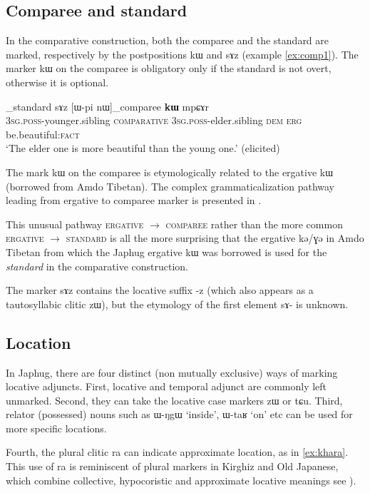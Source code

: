 \documentclass[oldfontcommands,oneside,a4paper,11pt]{article}
\newcommand{\ipa}[1]{{\phon #1}} %
\begin{document}
\subsection{Comparee and standard}
In the comparative construction, both the comparee and the standard are marked, respectively by the postpositions \ipa{kɯ} and \ipa{sɤz}  (example \ref{ex:comp1}). The marker \ipa{kɯ} on the comparee is obligatory only if the standard is not overt, otherwise it is optional.

\begin{exe}
\ex \label{ex:comp1}
\gll  [\ipa{ɯ-ʁi}]_{standard}   	\ipa{sɤz}   	[\ipa{ɯ-pi}   	\ipa{nɯ}]_{comparee}   	\ipa{\textbf{kɯ}}   	\ipa{mpɕɤr}     \\
\textsc{3sg.poss}-younger.sibling \textsc{comparative} \textsc{3sg.poss}-elder.sibling \textsc{dem} \textsc{erg}  be.beautiful:\textsc{fact} \\
\glt `The elder one is more beautiful than the young one.' (elicited)
\end{exe}

The mark \ipa{kɯ} on the comparee is etymologically related to the ergative \ipa{kɯ} (borrowed from Amdo Tibetan). The complex grammaticalization pathway leading from ergative to comparee marker is presented in \citet{jacques15comparative}. 

This unusual pathway \textsc{ergative} $\rightarrow$ \textsc{comparee} rather than the more common \textsc{ergative} $\rightarrow$ \textsc{standard} is all the more surprising that the ergative \ipa{kə/ɣə} in Amdo Tibetan from which the Japhug ergative \ipa{kɯ} was borrowed is used for the \textit{standard} in the comparative construction.

The marker \ipa{sɤz} contains the locative suffix \ipa{-z} (which also appears as a tautosyllabic clitic \ipa{zɯ}), but the etymology of the first element \ipa{sɤ-} is unknown. 

 \subsection{Location}   \label{sec:loc}
In Japhug, there are four distinct (non mutually exclusive) ways of marking locative adjuncts. First, locative and temporal adjunct are commonly left unmarked. Second, they can  take the locative case markers \ipa{zɯ} or \ipa{tɕu}. Third, relator (possessed) nouns such as \ipa{ɯ-ŋgɯ} `inside', \ipa{ɯ-taʁ} `on' etc can be used for more specific locations. 

Fourth, the plural clitic \ipa{ra} can indicate approximate location, as in \ref{ex:khara}. This use of \ipa{ra} is reminiscent of plural markers in Kirghiz and Old Japanese, which combine collective, hypocoristic and approximate locative meanings see \citealt[195]{antonov07ra}).
\end{document}

